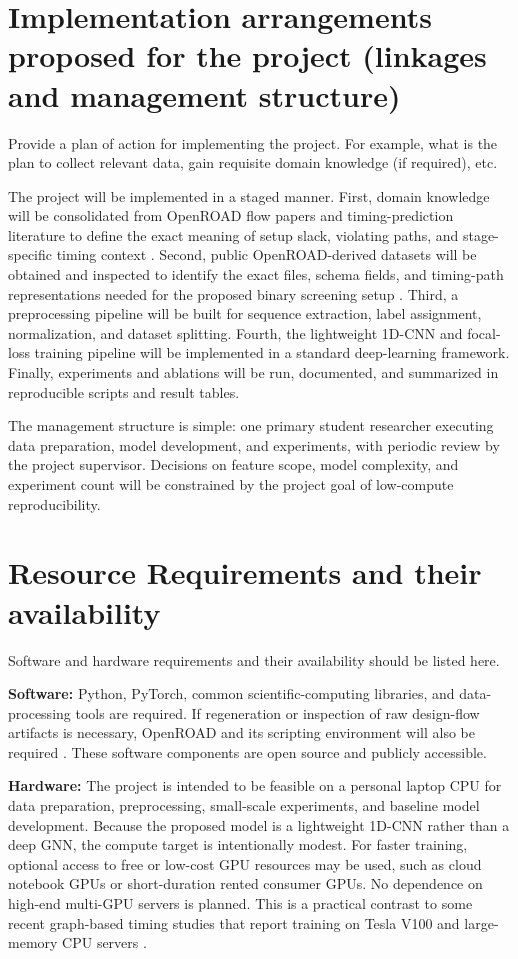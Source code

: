 \documentclass[12pt,a4paper]{article}
\begin{document}
\section{Implementation arrangements proposed for the project (linkages and management structure) }

Provide a plan of action for implementing the project. For example, what is the plan to collect relevant data, gain requisite domain knowledge (if required), etc.

The project will be implemented in a staged manner. First, domain knowledge will be consolidated from OpenROAD flow papers and timing-prediction literature to define the exact meaning of setup slack, violating paths, and stage-specific timing context \cite{Ajayi2019OpenROAD,KahngOpenROAD,Li2025GATSlack}. Second, public OpenROAD-derived datasets will be obtained and inspected to identify the exact files, schema fields, and timing-path representations needed for the proposed binary screening setup \cite{Shrestha2026EDASchemaV2,Shrestha2024EDASchema}. Third, a preprocessing pipeline will be built for sequence extraction, label assignment, normalization, and dataset splitting. Fourth, the lightweight 1D-CNN and focal-loss training pipeline will be implemented in a standard deep-learning framework. Finally, experiments and ablations will be run, documented, and summarized in reproducible scripts and result tables.

The management structure is simple: one primary student researcher executing data preparation, model development, and experiments, with periodic review by the project supervisor. Decisions on feature scope, model complexity, and experiment count will be constrained by the project goal of low-compute reproducibility.

\section{Resource Requirements and their availability}
Software and hardware requirements and their availability should be listed here.

\textbf{Software:} Python, PyTorch, common scientific-computing libraries, and data-processing tools are required. If regeneration or inspection of raw design-flow artifacts is necessary, OpenROAD and its scripting environment will also be required \cite{Ajayi2019OpenROAD,Reda2020OpenROADFlow}. These software components are open source and publicly accessible.

\textbf{Hardware:} The project is intended to be feasible on a personal laptop CPU for data preparation, preprocessing, small-scale experiments, and baseline model development. Because the proposed model is a lightweight 1D-CNN rather than a deep GNN, the compute target is intentionally modest. For faster training, optional access to free or low-cost GPU resources may be used, such as cloud notebook GPUs or short-duration rented consumer GPUs. No dependence on high-end multi-GPU servers is planned. This is a practical contrast to some recent graph-based timing studies that report training on Tesla V100 and large-memory CPU servers \cite{Ding2024PTAGNN}.
\end{document}
